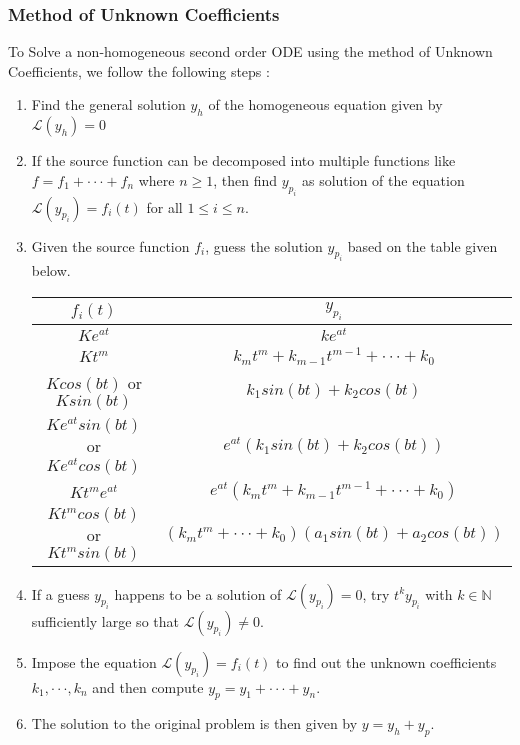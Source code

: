 \documentclass[10pt]{article}
\begin{document}
            \subsubsection{Method of Unknown Coefficients}
                To Solve a non-homogeneous second order ODE using the method of Unknown Coefficients, we follow the following steps :
                \begin{enumerate}
                    \item Find the general solution $y_h$ of the homogeneous equation given by $\mathcal{L}(y_h) = 0$
                    \item If the source function can be decomposed into multiple functions like $f = f_1 + \cdot \cdot \cdot + f_n$ where $n \geq 1$, then find $y_{p_i}$ as  solution of the equation $\mathcal{L}(y_{p_i}) = f_i(t)$ for all $1\leq i\leq n$.
                    \item Given the source function $f_i$, guess the solution $y_{p_i}$ based on the table given below.
                    \begin{center}
                        \begin{tabular}{| c | c |}
                        \hline
                             $f_i(t)$ & $y_{p_i}$ \\
                             \hline \hline
                             $Ke^{at}$ & $ke^{at}$ \\
                             \hline
                             $Kt^m$ & $k_mt^m + k_{m-1}t^{m-1} + \cdot \cdot \cdot + k_0$\\
                             \hline
                             $Kcos(bt)$ or $Ksin(bt)$ & $k_1 sin (bt) + k_2 cos(bt)$\\
                             \hline
                             $Ke^{at} sin (bt)$ or $Ke^{at} cos(bt)$ & $e^{at}(k_1 sin (bt) + k_2 cos(bt))$ \\
                             \hline 
                             $Kt^me^{at}$ & $e^{at}(k_mt^m + k_{m-1}t^{m-1} + \cdot \cdot \cdot + k_0)$\\
                             \hline
                             $Kt^m cos(bt)$ or $Kt^m sin(bt)$ & $(k_mt^m + \cdot \cdot \cdot + k_0)(a_1 sin (bt) + a_2 cos(bt))$\\
                             \hline
                        \end{tabular}
                    \end{center}
                    \item If a guess $y_{p_i}$ happens to be a solution of $\mathcal{L}(y_{p_i}) = 0$, try $t^k y_{p_i}$ with $k \in \mathbb{N}$ sufficiently large so that $\mathcal{L}(y_{p_i}) \neq 0$.
                    \item Impose the equation $\mathcal{L}(y_{p_i}) = f_i(t)$ to find out the unknown coefficients $k_1, \cdot \cdot \cdot , k_n$ and then compute $y_p = y_1 + \cdot \cdot \cdot + y_n$.
                    \item The solution to the original problem is then given by $y = y_h + y_p$.
                \end{enumerate}
\end{document}
